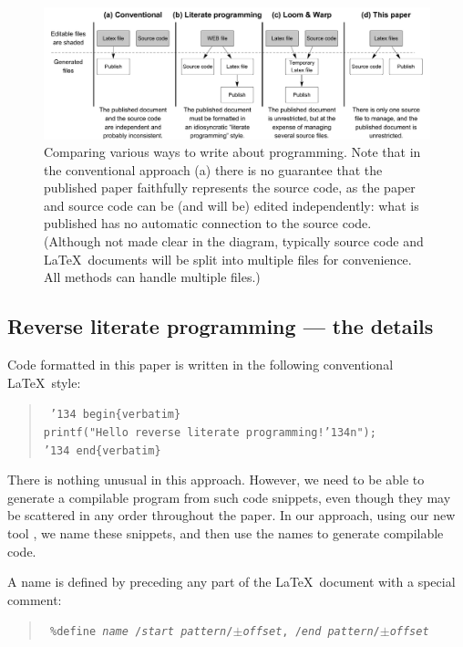 \documentclass[prodmode,acmtecs]{acmsmall} %
\begin{document}
\begin{figure}
\begin{center}
\includegraphics[width=.9\textwidth]{figures/literateProgramming.pdf}
\end{center}
\caption{Comparing various ways to write about programming. Note that in the conventional approach (a) there is no guarantee that the published paper faithfully represents the source code, as the paper and source code can be (and will be) edited independently: what is published has no automatic connection to the source code. (Although not made clear in the diagram, typically source code and \LaTeX\ documents will be split into multiple files for convenience. All methods can handle multiple files.)}
\label{fig:lp}
\end{figure}

\subsection{Reverse literate programming --- the details}

Code formatted in this paper is written in the following conventional \LaTeX\ style:

\begin{verse}\tt
\char'134 begin\{verbatim\}\\
printf("Hello reverse literate programming!\char'134n");\\
\char'134 end\{verbatim\}
\end{verse}

There is nothing unusual in this approach. However, we need to be able to generate a compilable program from such code snippets, even though they may be scattered in any order throughout the paper. In our approach, using our new tool , we name these snippets, and then use the names to generate compilable code.

A name is defined by preceding any part of the \LaTeX\ document with a special comment: 

\begin{verse}\tt
\%{}define \emph{name} /\emph{start pattern}/$\pm$\emph{offset}, /\emph{end pattern}/$\pm$\emph{offset}
\end{verse} 
\end{document}

